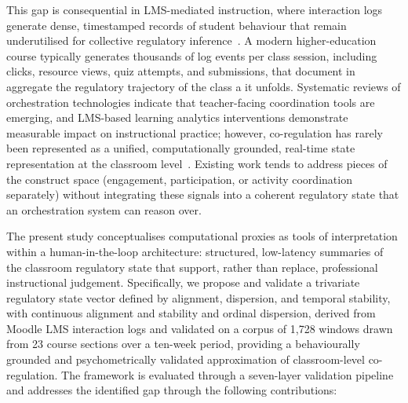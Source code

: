\documentclass[preprint,12pt,authoryear]{elsarticle}
\begin{document}
This gap is consequential in LMS-mediated instruction, where interaction logs generate dense, timestamped records of student behaviour that remain underutilised for collective regulatory inference~\citep{holstein2019, amarasinghe2020, martinezmaldonado2019}. A modern higher-education course typically generates thousands of log events per class session, including clicks, resource views, quiz attempts, and submissions, that document in aggregate the regulatory trajectory of the class a it unfolds. Systematic reviews of orchestration technologies indicate that teacher-facing coordination tools are emerging, and LMS-based learning analytics interventions demonstrate measurable impact on instructional practice; however, co-regulation has rarely been represented as a unified, computationally grounded, real-time state representation at the classroom level~\citep{feng2023, pan2024, saqr2023}. Existing work tends to address pieces of the construct space (engagement, participation, or activity coordination separately) without integrating these signals into a coherent regulatory state that an orchestration system can reason over.

The present study conceptualises computational proxies as tools of interpretation within a human-in-the-loop architecture: structured, low-latency summaries of the classroom regulatory state that support, rather than replace, professional instructional judgement. Specifically, we propose and validate a trivariate regulatory state vector defined by alignment, dispersion, and temporal stability, with continuous alignment and stability and ordinal dispersion, derived from Moodle LMS interaction logs and validated on a corpus of 1{,}728 windows drawn from 23 course sections over a ten-week period, providing a behaviourally grounded and psychometrically validated approximation of classroom-level co-regulation. The framework is evaluated through a seven-layer validation pipeline and addresses the identified gap through the following contributions:
\end{document}
